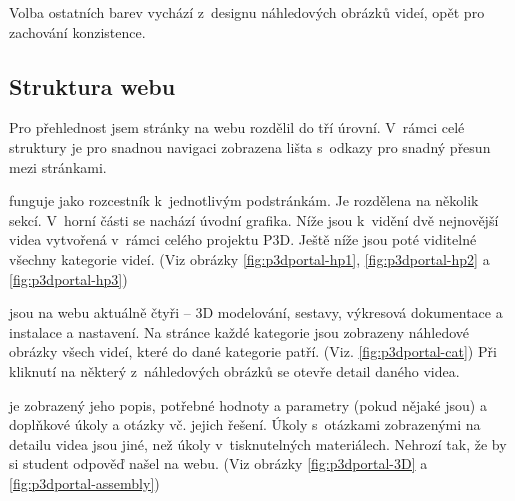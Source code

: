 Volba ostatních barev vychází z~designu náhledových obrázků videí, opět pro zachování konzistence.

\subsection{Struktura webu}
Pro přehlednost jsem stránky na webu rozdělil do tří úrovní. 
V~rámci celé struktury je pro snadnou navigaci zobrazena lišta s~odkazy pro snadný přesun mezi stránkami.

\noindent{} funguje jako rozcestník k~jednotlivým podstránkám. Je rozdělena na několik sekcí. V~horní části se nachází úvodní grafika. Níže jsou k~vidění dvě nejnovější videa vytvořená v~rámci celého projektu P3D. Ještě níže jsou poté viditelné všechny kategorie videí. (Viz obrázky \ref{fig:p3dportal-hp1}, \ref{fig:p3dportal-hp2} a \ref{fig:p3dportal-hp3})

\noindent{} jsou na webu aktuálně čtyři -- 3D modelování, sestavy, výkresová dokumentace a instalace a nastavení. Na stránce každé kategorie jsou zobrazeny náhledové obrázky všech videí, které do dané kategorie patří. (Viz. \autoref{fig:p3dportal-cat})
Při kliknutí na některý z~náhledových obrázků se otevře detail daného videa. 

\noindent{} je zobrazený jeho popis, potřebné hodnoty a parametry (pokud nějaké jsou) a doplňkové úkoly a otázky vč. jejich řešení. Úkoly s~otázkami zobrazenými na detailu videa jsou jiné, než úkoly v~tisknutelných materiálech. Nehrozí tak, že by si student odpověď našel na webu. (Viz obrázky \ref{fig:p3dportal-3D} a \ref{fig:p3dportal-assembly})

